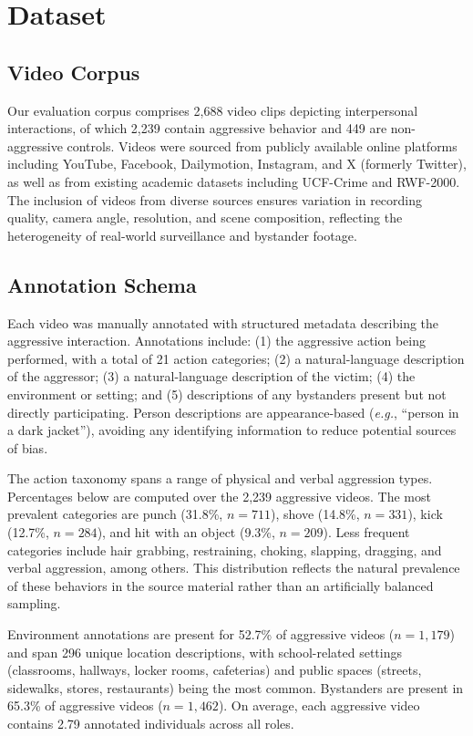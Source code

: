 \section{Dataset}

\subsection{Video Corpus}

Our evaluation corpus comprises 2,688 video clips depicting interpersonal interactions, of which 2,239 contain aggressive behavior and 449 are non-aggressive controls.
Videos were sourced from publicly available online platforms including YouTube, Facebook, Dailymotion, Instagram, and X (formerly Twitter), as well as from existing academic datasets including UCF-Crime and RWF-2000.
The inclusion of videos from diverse sources ensures variation in recording quality, camera angle, resolution, and scene composition, reflecting the heterogeneity of real-world surveillance and bystander footage.

\subsection{Annotation Schema}

Each video was manually annotated with structured metadata describing the aggressive interaction.
Annotations include: (1) the aggressive action being performed, with a total of 21 action categories; (2) a natural-language description of the aggressor; (3) a natural-language description of the victim; (4) the environment or setting; and (5) descriptions of any bystanders present but not directly participating.
Person descriptions are appearance-based (\textit{e.g.}, ``person in a dark jacket''), avoiding any identifying information to reduce potential sources of bias.

The action taxonomy spans a range of physical and verbal aggression types.
Percentages below are computed over the 2,239 aggressive videos.
The most prevalent categories are punch (31.8\%, $n = 711$), shove (14.8\%, $n = 331$), kick (12.7\%, $n = 284$), and hit with an object (9.3\%, $n = 209$).
Less frequent categories include hair grabbing, restraining, choking, slapping, dragging, and verbal aggression, among others.
This distribution reflects the natural prevalence of these behaviors in the source material rather than an artificially balanced sampling.

Environment annotations are present for 52.7\% of aggressive videos ($n = 1,179$) and span 296 unique location descriptions, with school-related settings (classrooms, hallways, locker rooms, cafeterias) and public spaces (streets, sidewalks, stores, restaurants) being the most common.
Bystanders are present in 65.3\% of aggressive videos ($n = 1,462$).
On average, each aggressive video contains 2.79 annotated individuals across all roles.

